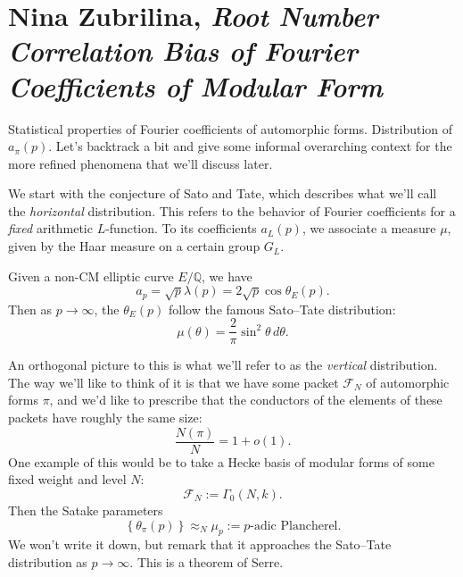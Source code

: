 \documentclass[reqno]{amsart} 
\begin{document}
\section{Nina Zubrilina, \emph{Root Number Correlation Bias of Fourier Coefficients of Modular Form}}
Statistical properties of Fourier coefficients of automorphic forms.  Distribution of $a_\pi (p)$.  Let's backtrack a bit and give some informal overarching context for the more refined phenomena that we'll discuss later.

We start with the conjecture of Sato and Tate, which describes what we'll call the \emph{horizontal } distribution.  This refers to the behavior of Fourier coefficients for a \emph{fixed} arithmetic $L$-function.  To its coefficients $a_L (p)$, we associate a measure $\mu$, given by the Haar measure on a certain group $G_L$.
\begin{example}
  Given a non-CM elliptic curve $E/\mathbb{Q}$, we have
  \begin{equation*}
    a_p = \sqrt{p} \lambda (p)
    = 2 \sqrt{p} \cos \theta_E (p).
  \end{equation*}
  Then as $p \rightarrow \infty$, the $\theta_E (p)$ follow the famous Sato--Tate distribution:
  \begin{equation*}
    \mu (\theta) = \frac{2}{ \pi } \sin^2 \theta \, d \theta .
  \end{equation*}
\end{example}

An orthogonal picture to this is what we'll refer to as the \emph{vertical} distribution.  The way we'll like to think of it is that we have some packet $\mathcal{F}_N $ of automorphic forms $\pi$, and we'd like to prescribe that the conductors of the elements of these packets have roughly the same size:
\begin{equation*}
\frac{N (\pi) }{N} = 1 + o(1).
\end{equation*}
One example of this would be to take a Hecke basis of modular forms of some fixed weight and level $N$:
\begin{equation*}
\mathcal{F}_N := \Gamma_0(N,k).
\end{equation*}
Then the Satake parameters
\begin{equation*}
  \left\{ \theta_\pi (p)  \right\} \approx_N
  \mu_p := \text{$p$-adic Plancherel}.
\end{equation*}
We won't write it down, but remark that it approaches the Sato--Tate distribution as $p \rightarrow \infty $.  This is a theorem of Serre.
\end{document}
